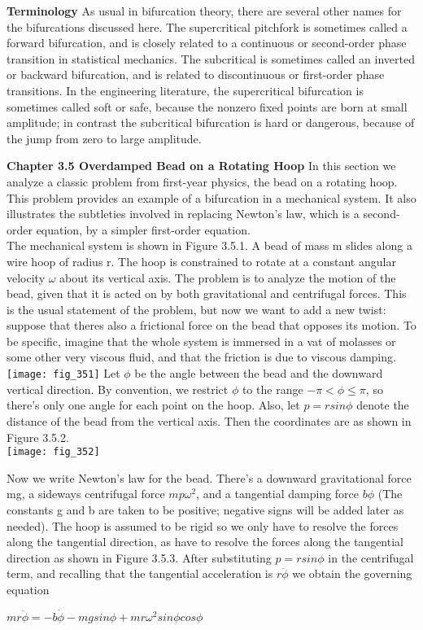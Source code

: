\documentclass{article}
\newcommand\tab[1][1cm]{\hspace*{#1}}
\begin{document}
\textbf {Terminology} 
As usual in bifurcation theory, there are several other names for the bifurcations discussed here. The supercritical pitchfork is sometimes called a forward bifurcation, and is closely related to a continuous or second-order phase transition in statistical mechanics. The subcritical is sometimes called an inverted or backward bifurcation, and is related to discontinuous or first-order phase transitions. In the engineering literature, the supercritical bifurcation is sometimes called soft or safe, because the nonzero fixed points are born at small amplitude; in contrast the subcritical bifurcation is hard or dangerous, because of the jump from zero to large amplitude.

\textbf {Chapter 3.5 Overdamped Bead on a Rotating Hoop} 
In this section we analyze a classic problem from first-year physics, the bead on a rotating hoop. This problem provides an example of a bifurcation in a mechanical system. It also illustrates the subtleties involved in replacing Newton's law, which is a second-order equation, by a simpler first-order equation.  \\ \tab
The mechanical system is shown in Figure 3.5.1. A bead of mass m slides along a wire hoop of radius r. The hoop is constrained to rotate at a constant angular velocity $\omega$ about its vertical axis. The problem is to analyze the motion of the bead, given that it is acted on by both gravitational and centrifugal forces. This is the usual statement of the problem, but now we want to add a new twist: suppose that theres also a frictional force on the bead that opposes its motion. To be specific, imagine that the whole system is immersed in a vat of molasses or some other very viscous fluid, and that the friction is due to viscous damping.
\\
\texttt{[image: fig\_351]}
Let $\phi$ be the angle between the bead and the downward vertical direction. By convention, we restrict $\phi$ to the range $-\pi < \phi \leq \pi$, so there's only one angle for each point on the hoop. Also, let $p=r sin\phi$ denote the distance of the bead from the vertical axis. Then the coordinates are as shown in Figure 3.5.2.
\\
\texttt{[image: fig\_352]}

Now we write Newton's law for the bead. There's a downward gravitational force mg, a sideways centrifugal force $mp\omega^{2}$, and a tangential damping force $b\phi$ (The constants g and b are taken to be positive; negative signs will be added later as needed). The hoop is assumed to be rigid so we only have to resolve the forces along the tangential direction, as have to resolve the forces along the tangential direction as shown in Figure 3.5.3. After substituting $p=rsin\phi$ in the centrifugal term, and recalling that the tangential acceleration is $r\ddot{\phi}$ we obtain the governing equation
\begin{center}
$mr\ddot{\phi}=-b \dot{\phi}-mg sin\phi+mr\omega^{2}sin\phi cos{\phi}$
\end{center}
\end{document}
